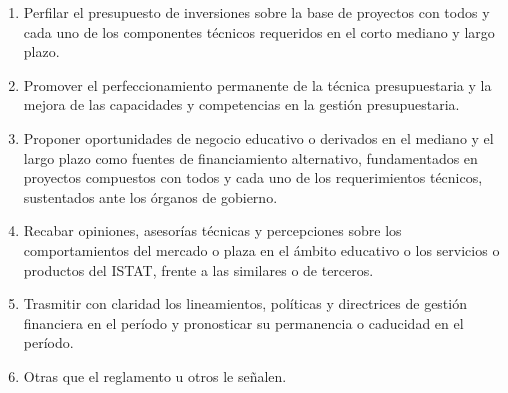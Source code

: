\begin{enumerate}
\item Perfilar el presupuesto de inversiones sobre la base de proyectos con todos y cada uno de los componentes técnicos requeridos en el corto mediano y largo plazo. 
\item Promover el perfeccionamiento permanente de la técnica presupuestaria y la mejora de las capacidades y competencias en la gestión presupuestaria. 
\item Proponer oportunidades de negocio educativo o derivados en el mediano y el largo plazo como fuentes de financiamiento alternativo, fundamentados en proyectos compuestos con todos y cada uno de los requerimientos técnicos, sustentados ante los órganos de gobierno. 
\item Recabar opiniones, asesorías técnicas y percepciones sobre los comportamientos del mercado o plaza en el ámbito educativo o los servicios o productos del ISTAT, frente a las similares o de terceros. 
\item Trasmitir con claridad los lineamientos, políticas y directrices de gestión financiera en el período y pronosticar su permanencia o caducidad en el período. 
\item Otras que el reglamento u otros le señalen. 
\end{enumerate}
